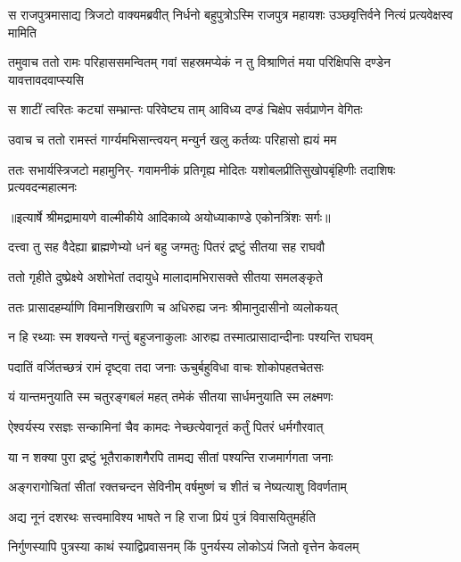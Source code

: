 \threelineshloka
{स राजपुत्रमासाद्य त्रिजटो वाक्यमब्रवीत्}
{निर्धनो बहुपुत्रोऽस्मि राजपुत्र महायशः}
{उञ्छवृत्तिर्वने नित्यं प्रत्यवेक्षस्व मामिति} %

\threelineshloka
{तमुवाच ततो रामः परिहाससमन्वितम्}
{गवां सहस्रमप्येकं न तु विश्राणितं मया}
{परिक्षिपसि दण्डेन यावत्तावदवाप्स्यसि} %

\twolineshloka
{स शाटीं त्वरितः कट्यां सम्भ्रान्तः परिवेष्ट्य ताम्}
{आविध्य दण्डं चिक्षेप सर्वप्राणेन वेगितः} %

\twolineshloka
{उवाच च ततो रामस्तं गार्ग्यमभिसान्त्वयन्}
{मन्युर्न खलु कर्तव्यः परिहासो ह्ययं मम} %

\fourlineindentedshloka
{ततः सभार्यस्त्रिजटो महामुनिर्-}
{गवामनीकं प्रतिगृह्य मोदितः}
{यशोबलप्रीतिसुखोपबृंहिणीः}
{तदाशिषः प्रत्यवदन्महात्मनः} %


{॥इत्यार्षे श्रीमद्रामायणे वाल्मीकीये आदिकाव्ये अयोध्याकाण्डे एकोनत्रिंशः सर्गः॥}


\twolineshloka
{दत्त्वा तु सह वैदेह्या ब्राह्मणेभ्यो धनं बहु}
{जग्मतुः पितरं द्रष्टुं सीतया सह राघवौ} %

\twolineshloka
{ततो गृहीते दुष्प्रेक्ष्ये अशोभेतां तदायुधे}
{मालादामभिरासक्ते सीतया समलङ्कृते} %

\twolineshloka
{ततः प्रासादहर्म्याणि विमानशिखराणि च}
{अधिरुह्य जनः श्रीमानुदासीनो व्यलोकयत्} %

\twolineshloka
{न हि रथ्याः स्म शक्यन्ते गन्तुं बहुजनाकुलाः}
{आरुह्य तस्मात्प्रासादान्दीनाः पश्यन्ति राघवम्} %

\twolineshloka
{पदातिं वर्जितच्छत्रं रामं दृष्ट्वा तदा जनाः}
{ऊचुर्बहुविधा वाचः शोकोपहतचेतसः} %

\twolineshloka
{यं यान्तमनुयाति स्म चतुरङ्गबलं महत्}
{तमेकं सीतया सार्धमनुयाति स्म लक्ष्मणः} %

\twolineshloka
{ऐश्वर्यस्य रसज्ञः सन्कामिनां चैव कामदः}
{नेच्छत्येवानृतं कर्तुं पितरं धर्मगौरवात्} %

\twolineshloka
{या न शक्या पुरा द्रष्टुं भूतैराकाशगैरपि}
{तामद्य सीतां पश्यन्ति राजमार्गगता जनाः} %

\twolineshloka
{अङ्गरागोचितां सीतां रक्तचन्दन सेविनीम्}
{वर्षमुष्णं च शीतं च नेष्यत्याशु विवर्णताम्} %

\twolineshloka
{अद्य नूनं दशरथः सत्त्वमाविश्य भाषते}
{न हि राजा प्रियं पुत्रं विवासयितुमर्हति} %

\twolineshloka
{निर्गुणस्यापि पुत्रस्या काथं स्याद्विप्रवासनम्}
{किं पुनर्यस्य लोकोऽयं जितो वृत्तेन केवलम्} %

